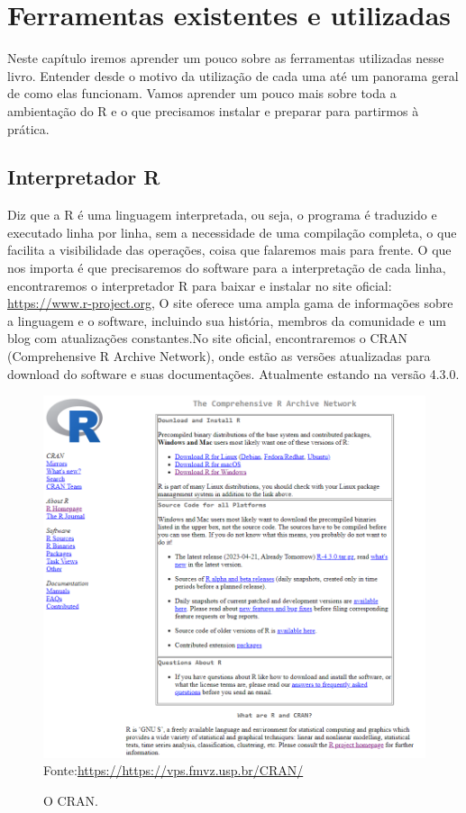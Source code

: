 %


\chapter{Ferramentas existentes e utilizadas}

Neste capítulo iremos aprender um pouco sobre as ferramentas utilizadas nesse livro. Entender desde o motivo da utilização de cada uma até um panorama geral de como elas funcionam. Vamos aprender um pouco mais sobre toda a ambientação do R e o que precisamos instalar e preparar para partirmos à prática.



    \section{Interpretador R}
    \cite{Davies2016} Diz que a R é uma linguagem interpretada, ou seja, o programa é traduzido e executado linha por linha, sem a necessidade de uma compilação completa, o que facilita a visibilidade das operações, coisa que falaremos mais para frente. O que nos importa é que precisaremos do software para a interpretação de cada linha, encontraremos o interpretador R para baixar e instalar no site oficial: \url{https://www.r-project.org}, O site oferece uma ampla gama de informações sobre a linguagem e o software, incluindo sua história, membros da comunidade e um blog com atualizações constantes.No site oficial, encontraremos o CRAN (Comprehensive R Archive Network), onde estão as versões atualizadas para download do software e suas documentações. Atualmente estando na versão 4.3.0.
    \begin{figure}[H]
    	\centering
    	\caption{O CRAN.}
    	\includegraphics[width=1.0\linewidth]{Prints/screenshot026}
    	\label{fig:screenshot026}
    	{\tiny \sf Fonte:\url{https://https://vps.fmvz.usp.br/CRAN/} }
    \end{figure}
    

